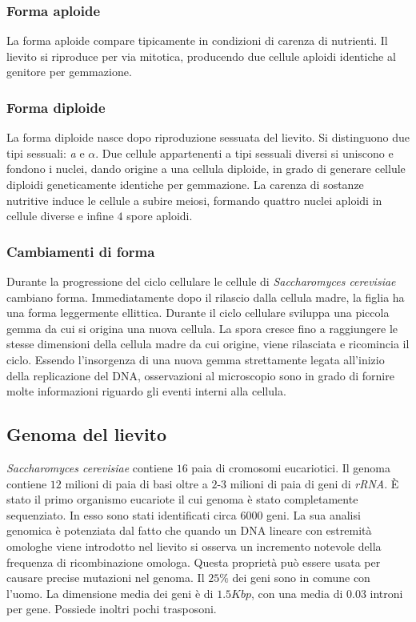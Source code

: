 		\subsubsection*{Forma aploide}
		La forma aploide compare tipicamente in condizioni di carenza di nutrienti.
		Il lievito si riproduce per via mitotica, producendo due cellule aploidi identiche al genitore per gemmazione.

		\subsubsection*{Forma diploide}
		La forma diploide nasce dopo riproduzione sessuata del lievito.
		Si distinguono due tipi sessuali: \emph{a} e \emph{$\alpha$}.
		Due cellule appartenenti a tipi sessuali diversi si uniscono e fondono i nuclei, dando origine a una cellula diploide, in grado di generare cellule diploidi geneticamente identiche per gemmazione.
		La carenza di sostanze nutritive induce le cellule a subire meiosi, formando quattro nuclei aploidi in cellule diverse e infine $4$ spore aploidi.

		\subsubsection*{Cambiamenti di forma}
		Durante la progressione del ciclo cellulare le cellule di \emph{Saccharomyces cerevisiae} cambiano forma.
		Immediatamente dopo il rilascio dalla cellula madre, la figlia ha una forma leggermente ellittica.
		Durante il ciclo cellulare sviluppa una piccola gemma da cui si origina una nuova cellula.
		La spora cresce fino a raggiungere le stesse dimensioni della cellula madre da cui origine, viene rilasciata e ricomincia il ciclo.
		Essendo l'insorgenza di una nuova gemma strettamente legata all'inizio della replicazione del DNA, osservazioni al microscopio sono in grado di fornire molte informazioni riguardo gli eventi interni alla cellula.
		
	\subsection*{Genoma del lievito}
		\emph{Saccharomyces cerevisiae} contiene $16$ paia di cromosomi eucariotici.
		Il genoma contiene $12$ milioni di paia di basi oltre a $2$-$3$ milioni di paia di geni di \emph{rRNA}.
		\`E stato il primo organismo eucariote il cui genoma \`e stato completamente sequenziato.
		In esso sono stati identificati circa \num{6000} geni.
		La sua analisi genomica \`e potenziata dal fatto che quando un DNA lineare con estremit\`a omologhe viene introdotto nel lievito si osserva un incremento notevole della frequenza di ricombinazione omologa.
		Questa propriet\`a pu\`o essere usata per causare precise mutazioni nel genoma.
		Il $25\%$ dei geni sono in comune con l'uomo.
		La dimensione media dei geni \`e di $1.5Kbp$, con una media di $0.03$ introni per gene.
		Possiede inoltri pochi trasposoni.

